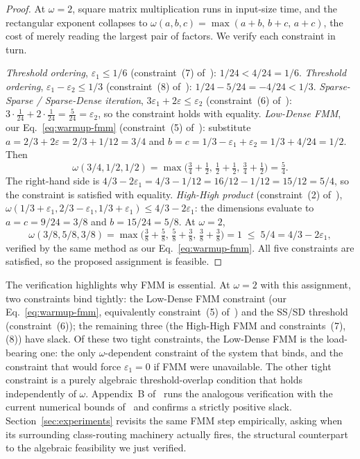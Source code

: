 \documentclass[sigconf,nonacm]{acmart}
\theoremstyle{plain}
\theoremstyle{definition}
\newcommand{\rfmm}[3]{\omega(#1,#2,#3)}
\begin{document}
\begin{proof}
At $\omega = 2$, square matrix multiplication runs in input-size time,
and the rectangular exponent collapses to
$\rfmm{a}{b}{c} = \max(a+b,\,b+c,\,a+c)$, the cost of merely reading
the largest pair of factors. We verify each constraint in turn.

\emph{Threshold ordering}, $\varepsilon_1 \le 1/6$ (constraint~(7)
of~\cite{AssadiShah25}): $1/24 < 4/24 = 1/6$.
\emph{Threshold ordering}, $\varepsilon_1 - \varepsilon_2 \le 1/3$
(constraint~(8) of~\cite{AssadiShah25}): $1/24 - 5/24 = -4/24 < 1/3$.
\emph{Sparse-Sparse / Sparse-Dense iteration},
$3\varepsilon_1 + 2\varepsilon \le \varepsilon_2$ (constraint~(6)
of~\cite{AssadiShah25}):
$3\cdot \tfrac{1}{24} + 2\cdot \tfrac{1}{24} = \tfrac{5}{24} = \varepsilon_2$,
so the constraint holds with equality.
\emph{Low-Dense FMM}, our Eq.~\eqref{eq:warmup-fmm} (constraint~(5)
of~\cite{AssadiShah25}):
substitute $a = 2/3 + 2\varepsilon = 2/3 + 1/12 = 3/4$ and
$b = c = 1/3 - \varepsilon_1 + \varepsilon_2 = 1/3 + 4/24 = 1/2$.
Then
\[
\rfmm{3/4}{1/2}{1/2} = \max\!\big(\tfrac{3}{4}+\tfrac{1}{2},\,
\tfrac{1}{2}+\tfrac{1}{2},\, \tfrac{3}{4}+\tfrac{1}{2}\big)
= \tfrac{5}{4}.
\]
The right-hand side is
$4/3 - 2\varepsilon_1 = 4/3 - 1/12 = 16/12 - 1/12 = 15/12 = 5/4$,
so the constraint is satisfied with equality.
\emph{High-High product} (constraint~(2) of~\cite{AssadiShah25}),
$\rfmm{1/3+\varepsilon_1}{2/3-\varepsilon_1}{1/3+\varepsilon_1} \le 4/3-2\varepsilon_1$:
the dimensions evaluate to $a = c = 9/24 = 3/8$ and
$b = 15/24 = 5/8$. At $\omega = 2$,
\[
\rfmm{3/8}{5/8}{3/8} = \max\!\big(\tfrac{3}{8}+\tfrac{5}{8},\,
\tfrac{5}{8}+\tfrac{3}{8},\, \tfrac{3}{8}+\tfrac{3}{8}\big) = 1
\;\le\; 5/4 = 4/3 - 2\varepsilon_1,
\]
verified by the same method as our Eq.~\eqref{eq:warmup-fmm}.
All five constraints are satisfied, so the proposed assignment is
feasible.
\end{proof}

The verification highlights why FMM is essential. At $\omega = 2$
with this assignment, two constraints bind tightly: the Low-Dense
FMM constraint (our Eq.~\eqref{eq:warmup-fmm}, equivalently
constraint~(5) of~\cite{AssadiShah25}) and the SS/SD threshold
(constraint~(6)); the remaining three (the High-High FMM and
constraints~(7), (8)) have slack. Of these two tight constraints,
the Low-Dense FMM is the load-bearing one: the only
$\omega$-dependent constraint of the system that binds, and the
constraint that would force $\varepsilon_1 = 0$ if FMM were
unavailable. The other tight constraint is a purely algebraic
threshold-overlap condition that holds independently of $\omega$.
Appendix~B of~\cite{AssadiShah25} runs the analogous verification
with the current numerical bounds of~\cite{ADW25} and confirms a
strictly positive slack.
Section~\ref{sec:experiments} revisits the same FMM step
empirically, asking when its surrounding class-routing machinery
actually fires, the structural counterpart to the algebraic
feasibility we just verified.
\end{document}
